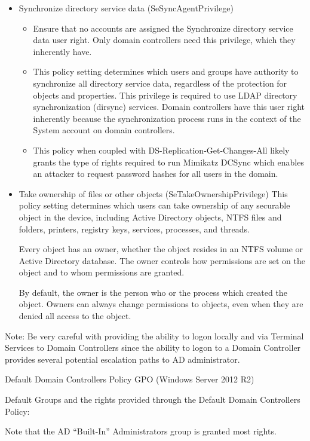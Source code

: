\begin{itemize}
    \item Synchronize directory service data (SeSyncAgentPrivilege)
    \begin{itemize}
        \item Ensure that no accounts are assigned the Synchronize directory service data user right. Only domain controllers need this privilege, which they inherently have.
        \item This policy setting determines which users and groups have authority to synchronize all directory service data, regardless of the protection for objects and properties. This privilege is required to use LDAP directory synchronization (dirsync) services. Domain controllers have this user right inherently because the synchronization process runs in the context of the System account on domain controllers.
        \item This policy when coupled with DS-Replication-Get-Changes-All likely grants the type of rights required to run Mimikatz DCSync which enables an attacker to request password hashes for all users in the domain.
    \end{itemize}
    \item Take ownership of files or other objects (SeTakeOwnershipPrivilege)
This policy setting determines which users can take ownership of any securable object in the device, including Active Directory objects, NTFS files and folders, printers, registry keys, services, processes, and threads.

Every object has an owner, whether the object resides in an NTFS volume or Active Directory database. The owner controls how permissions are set on the object and to whom permissions are granted.

By default, the owner is the person who or the process which created the object. Owners can always change permissions to objects, even when they are denied all access to the object.

\end{itemize}
Note: Be very careful with providing the ability to logon locally and via Terminal Services to Domain Controllers since the ability to logon to a Domain Controller provides several potential escalation paths to AD administrator.

 Default Domain Controllers Policy GPO (Windows Server 2012 R2)

 Default Groups and the rights provided through the Default Domain Controllers Policy:

Note that the AD “Built-In” Administrators group is granted most rights.

